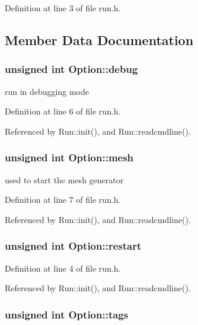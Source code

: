 Definition at line 3 of file run.h.

\subsection{Member Data Documentation}
\hypertarget{structOption_745cfac617607ad8812dfaee74040bcd}{
\subsubsection[{debug}]{\setlength{\rightskip}{0pt plus 5cm}unsigned int {\bf Option::debug}}}
\label{structOption_745cfac617607ad8812dfaee74040bcd}


run in debugging mode 



Definition at line 6 of file run.h.

Referenced by Run::init(), and Run::readcmdline().\hypertarget{structOption_b6d04183bbf7164b8f0df0c5d0943873}{
\subsubsection[{mesh}]{\setlength{\rightskip}{0pt plus 5cm}unsigned int {\bf Option::mesh}}}
\label{structOption_b6d04183bbf7164b8f0df0c5d0943873}


used to start the mesh generator 



Definition at line 7 of file run.h.

Referenced by Run::init(), and Run::readcmdline().\hypertarget{structOption_b57904cb40459f49649d4862893bce07}{
\subsubsection[{restart}]{\setlength{\rightskip}{0pt plus 5cm}unsigned int {\bf Option::restart}}}
\label{structOption_b57904cb40459f49649d4862893bce07}




Definition at line 4 of file run.h.

Referenced by Run::init(), and Run::readcmdline().\hypertarget{structOption_5b5df1a153576b7ae1716ab8564f1a12}{
\subsubsection[{tags}]{\setlength{\rightskip}{0pt plus 5cm}unsigned int {\bf Option::tags}}}
\label{structOption_5b5df1a153576b7ae1716ab8564f1a12}


